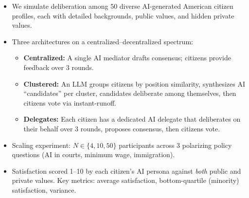 \documentclass{article}
\newcommand{\sectionafterspace}{0.8em}   %
\newcommand{\sectionheading}[1]{%
  \vspace{1.2em}%
  \noindent{\fontsize{36}{44}\selectfont\textbf{\textcolor{pivotalOrange}{#1}}}%
  \vspace{\sectionafterspace}\par%
}
\newlength{\panelmargin}
\begin{document}
{{\begin{minipage}[t]{\dimexpr\paperwidth-2\panelmargin-2\fboxsep\relax}
\begin{minipage}[t]{0.47\linewidth}
        \sectionheading{Methods}
        \begin{itemize}\setlength{\itemsep}{0.4cm}
          \item We simulate deliberation among 50 diverse AI-generated American citizen profiles, each with detailed backgrounds, public values, and hidden private values.
          \item Three architectures on a centralized--decentralized spectrum:
            \begin{itemize}\setlength{\itemsep}{0.2cm}
              \item[\textcolor{pivotalOrange}{$\blacksquare$}] \textbf{Centralized:} A single AI mediator drafts consensus; citizens provide feedback over 3 rounds.
              \item[\textcolor{pivotalBlue}{$\blacklozenge$}] \textbf{Clustered:} An LLM groups citizens by position similarity, synthesizes AI ``candidates'' per cluster, candidates deliberate among themselves, then citizens vote via instant-runoff.
              \item[\textcolor{pivotalGray}{$\bullet$}] \textbf{Delegates:} Each citizen has a dedicated AI delegate that deliberates on their behalf over 3 rounds, proposes consensus, then citizens vote.
            \end{itemize}
          \item Scaling experiment: $N \in \{4, 10, 50\}$ participants across 3 polarizing policy questions (AI in courts, minimum wage, immigration).
          \item Satisfaction scored 1--10 by each citizen's AI persona against \textit{both} public and private values. Key metrics: average satisfaction, bottom-quartile (minority) satisfaction, variance.
        \end{itemize}


\end{minipage}
\end{minipage}}}
\end{document}
